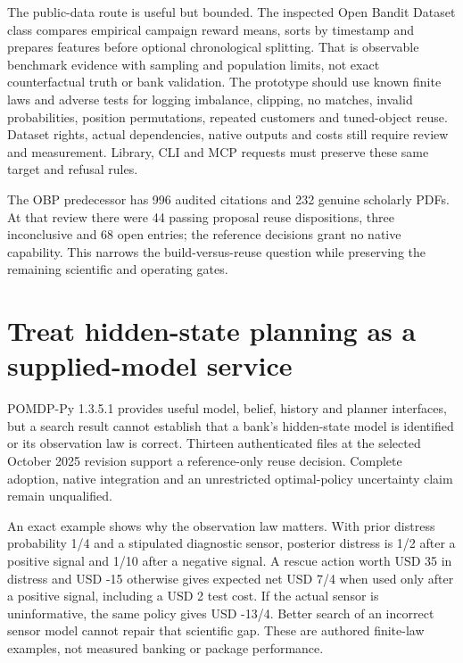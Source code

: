The public-data route is useful but bounded. The inspected Open Bandit
Dataset class compares empirical campaign reward means, sorts by
timestamp and prepares features before optional chronological splitting.
That is observable benchmark evidence with sampling and population
limits, not exact counterfactual truth or bank validation. The prototype
should use known finite laws and adverse tests for logging imbalance,
clipping, no matches, invalid probabilities, position permutations,
repeated customers and tuned-object reuse. Dataset rights, actual
dependencies, native outputs and costs still require review and
measurement. Library, CLI and MCP requests must preserve these same
target and refusal rules.
\citep{exec23_obp_sources,exec23_obp_reference}

The OBP predecessor has 996 audited citations and 232 genuine scholarly
PDFs. At that review there were 44 passing proposal reuse dispositions,
three inconclusive and 68 open entries; the reference decisions grant no
native capability. This narrows the build-versus-reuse question while
preserving the remaining scientific and operating gates.
\citep{sp23obp_reader,sp23obp_progress}

\hypertarget{treat-hidden-state-planning-as-a-supplied-model-service}{%
\section{Treat hidden-state planning as a supplied-model
service}\label{treat-hidden-state-planning-as-a-supplied-model-service}}

POMDP-Py 1.3.5.1 provides useful model, belief, history and planner
interfaces, but a search result cannot establish that a bank's
hidden-state model is identified or its observation law is correct.
Thirteen authenticated files at the selected October 2025 revision
support a reference-only reuse decision. Complete adoption, native
integration and an unrestricted optimal-policy uncertainty claim remain
unqualified. \citep{exec23_pomdppy_sources}

An exact example shows why the observation law matters. With prior
distress probability 1/4 and a stipulated diagnostic sensor, posterior
distress is 1/2 after a positive signal and 1/10 after a negative
signal. A rescue action worth USD 35 in distress and USD -15 otherwise
gives expected net USD 7/4 when used only after a positive signal,
including a USD 2 test cost. If the actual sensor is uninformative, the
same policy gives USD -13/4. Better search of an incorrect sensor model
cannot repair that scientific gap. These are authored finite-law
examples, not measured banking or package performance.
\citep{exec23_pomdppy_reference}

